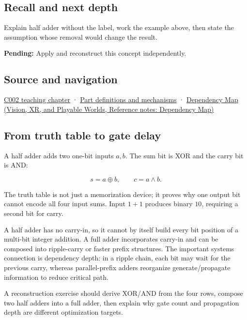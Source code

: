 \subsection{Recall and next depth}\label{appendix-1652d27a8e90-recall-and-next-depth}

Explain half adder without the label, work the example above, then state the assumption whose removal would change the result.

\textbf{Pending:} Apply and reconstruct this concept independently.

\subsection{Source and navigation}\label{appendix-1652d27a8e90-source-and-navigation}

\hyperref[01-foundations-i-ch001-arithmetic-becomes-a-policy]{C002 teaching chapter} · \hyperref[appendix-fd090d982a15]{Part definitions and mechanisms} · \href{../07-Vision-XR-and-Playable-Worlds/main.pdf\#nameddest=appendix-4ad47bdd269a}{Dependency Map (Vision, XR, and Playable Worlds, Reference notes: Dependency Map)}

\subsection{From truth table to gate delay}\label{appendix-1652d27a8e90-from-truth-table-to-gate-delay}

A half adder adds two one-bit inputs \(a,b\). The sum bit is XOR and the carry bit is AND:

\[
s=a\oplus b,\qquad c=a\land b.
\]

The truth table is not just a memorization device; it proves why one output bit cannot encode all four input sums. Input \(1+1\) produces binary \(10\), requiring a second bit for carry.

A half adder has no carry-in, so it cannot by itself build every bit position of a multi-bit integer addition. A full adder incorporates carry-in and can be composed into ripple-carry or faster prefix structures. The important systems connection is dependency depth: in a ripple chain, each bit may wait for the previous carry, whereas parallel-prefix adders reorganize generate/propagate information to reduce critical path.

A reconstruction exercise should derive XOR/AND from the four rows, compose two half adders into a full adder, then explain why gate count and propagation depth are different optimization targets.
